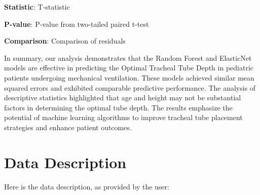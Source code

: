 \documentclass[11pt]{article}
\begin{document}
\begin{table}[h]
\caption{Comparison of residuals of the Random Forest and ElasticNet models}
\label{table:model_comparison}
\begin{threeparttable}
\renewcommand{\TPTminimum}{\linewidth}
\begin{tablenotes}
\footnotesize
\item \textbf{Statistic}: T-statistic
\item \textbf{P-value}: P-value from two-tailed paired t-test
\item \textbf{Comparison}: Comparison of residuals
\end{tablenotes}
\end{threeparttable}
\end{table}


In summary, our analysis demonstrates that the Random Forest and ElasticNet models are effective in predicting the Optimal Tracheal Tube Depth in pediatric patients undergoing mechanical ventilation. These models achieved similar mean squared errors and exhibited comparable predictive performance. The analysis of descriptive statistics highlighted that age and height may not be substantial factors in determining the optimal tube depth. The results emphasize the potential of machine learning algorithms to improve tracheal tube placement strategies and enhance patient outcomes.


\clearpage
\appendix

\section{Data Description} \label{sec:data_description} Here is the data description, as provided by the user:
\end{document}
